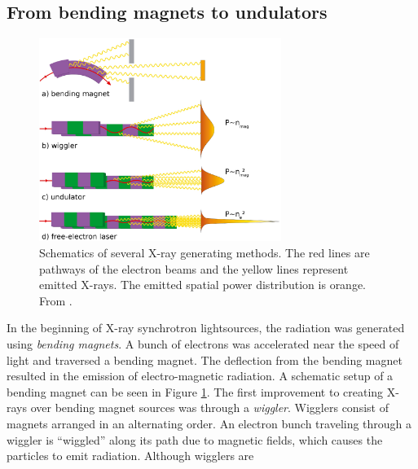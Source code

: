 \subsection{From bending magnets to undulators}\label{sec:undulator}
\begin{figure}[t]
	\centering
	\includegraphics[width=0.70\textwidth]{images/bending-to-FEL.png}
	\caption[Schematics of several X-ray generating methods.]{Schematics of several X-ray generating methods. The red lines are pathways of the electron beams and the yellow lines represent emitted X-rays. The emitted spatial power distribution is orange. From \citep[\href{http://creativecommons.org/licenses/by-nc-nd/3.0/de/}{\ccbyncndeu}]{Rupp-2013-Thesis}.}
	\label{fig:undulator}
\end{figure}
In the beginning of X-ray synchrotron lightsources, the radiation was generated using \textit{bending magnets}. A bunch of electrons was accelerated near the speed of light and traversed a bending magnet. The deflection from the bending magnet resulted in the emission of electro-magnetic radiation. A schematic setup of a bending magnet can be seen in Figure \ref{fig:undulator}. The first improvement to creating X-rays over bending magnet sources was through a \textit{wiggler}. Wigglers consist of magnets arranged in an alternating order. An electron bunch traveling through a wiggler is ``wiggled'' along its path due to magnetic fields, which causes the particles to emit radiation. Although wigglers are

